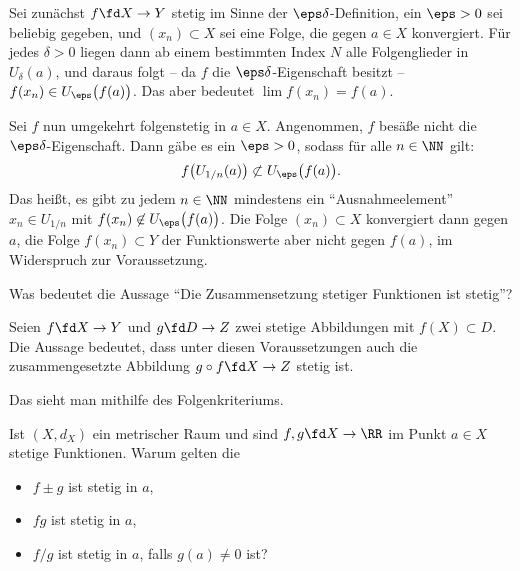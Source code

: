 \begin{antwort}
  Sei zunächst $f\fd X\to Y$ stetig 
  im Sinne der $\eps\delta$-Definition, 
  ein $\eps>0$ sei beliebig gegeben,  und $(x_n) \subset X$ sei eine Folge, 
  die gegen $a\in X$ konvergiert. 
  Für jedes $\delta>0$ liegen dann ab einem bestimmten Index $N$ 
  alle Folgenglieder in $U_\delta( a )$, und daraus folgt -- da $f$ die 
  $\eps\delta$-Eigenschaft besitzt -- $f(x_n) \in U_\eps\big( f(a) \big)$. Das 
  aber bedeutet $\lim f(x_n) = f(a)$.

  Sei $f$ nun umgekehrt folgenstetig in $a\in X$. 
  Angenommen, $f$ besäße nicht die 
  $\eps\delta$-Eigenschaft. Dann gäbe es ein $\eps>0$, sodass für alle 
  $n\in \NN$ gilt:
  \[
  f\big( U_{1/n}(a) \big)\not\subset U_\eps \big( f(a) \big).
  \]  
  Das heißt, es gibt zu jedem $n\in \NN$ mindestens ein "`Ausnahmeelement"'
  $x_n\in U_{1/n}$ mit $f(x_n)\not\in U_\eps \big( f(a) \big)$. 
  Die Folge $(x_n)\subset X$ konvergiert dann gegen $a$, 
  die Folge $f(x_n)\subset Y$ der Funktionswerte aber nicht gegen $f(a)$,
  im Widerspruch zur Voraussetzung.
  \AntEnd   
\end{antwort}

\begin{frage}
  \label{03_zuss}
  Was bedeutet die Aussage "`Die Zusammensetzung stetiger Funktionen 
  ist stetig"'?
\end{frage}

\begin{antwort}
  Seien $f \fd X\to Y$ und $g\fd D \to Z$ zwei stetige Abbildungen mit 
  $f(X)\subset D$. Die Aussage bedeutet, dass unter diesen Voraussetzungen 
  auch die zusammengesetzte Abbildung $g\circ f \fd X \to Z$ stetig ist.

  Das sieht man {\zB} mithilfe des Folgenkriteriums. 
  \AntEnd
\end{antwort}

\begin{frage}\label{03_perm}
  Ist $(X,d_X)$ ein metrischer Raum und sind 
  $f,g\fd X\to \RR$ im Punkt $a\in X$ 
  stetige Funktionen. Warum gelten die  
  \begin{itemize}[2mm]
  \item[\desc{a}] $f\pm g$ ist stetig in $a$,\\[-3.5mm]   
  \item[\desc{b}] $fg$ ist stetig in $a$, \\[-3.5mm]
  \item[\desc{c}] $f/g$ ist stetig in $a$, 
    falls $g(a)\not =0$ ist?
  \end{itemize}
\end{frage}


